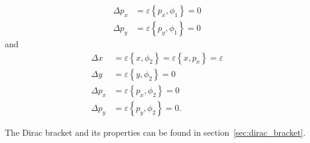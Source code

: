 \begin{solution}
\begin{align*}
\Delta p_x &= \varepsilon \left \{ p_x,\phi_1 \right \} = 0 \\
\Delta p_y &= \varepsilon \left \{ p_y,\phi_1 \right \} = 0
\end{align*}
and
\begin{align*}
\Delta x &= \varepsilon \left \{ x,\phi_2 \right \} = \varepsilon \left \{ x,p_x \right \} = \varepsilon \\
\Delta y &= \varepsilon \left \{ y,\phi_2 \right \} = 0 \\
\Delta p_x &= \varepsilon \left \{ p_x,\phi_2 \right \} = 0 \\
\Delta p_y &= \varepsilon \left \{ p_y,\phi_2 \right \} = 0.
\end{align*}

The Dirac bracket and its properties can be found in section~\vref{sec:dirac_bracket}.
\end{solution}


